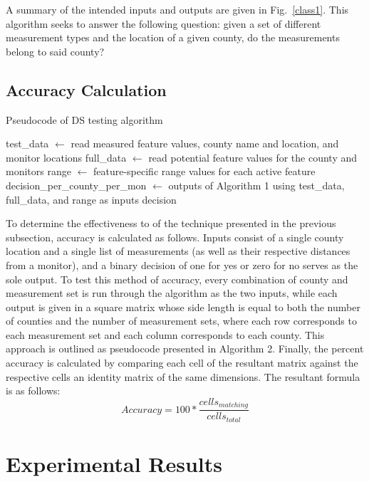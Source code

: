 \documentclass[12pt]{uthesis-v12}  %
\begin{document}
A summary of the intended inputs and outputs are given in Fig.~\ref{class1}. This algorithm seeks to answer the following question: given a set of different measurement types and the location of a given county, do the measurements belong to said county?

\subsection{Accuracy Calculation}

\begin{algorithm}
\caption{Pseudocode of DS testing algorithm} \label{alg-test}
\begin{algorithmic}[1]
\STATE test\_data $\leftarrow$ read measured feature values, county name and location, and monitor locations
\STATE full\_data $\leftarrow$ read potential feature values for the county and monitors
\STATE range $\leftarrow$ feature-specific range values for each active feature
		\STATE decision\_per\_county\_per\_mon $\leftarrow$ outputs of Algorithm 1 using test\_data, full\_data, and range as inputs
	\ENDFOR
\ENDFOR
\RETURN decision
	

\label{dst-test1}
\end{algorithmic}
\end{algorithm}

To determine the effectiveness to of the technique presented in the previous subsection, accuracy is calculated as follows. Inputs consist of a single county location and a single list of measurements (as well as their respective distances from a monitor), and a binary decision of one for yes or zero for no serves as the sole output. To test this method of accuracy, every combination of county and measurement set is run through the algorithm as the two inputs, while each output is given in a square matrix whose side length is equal to both the number of counties and the number of measurement sets, where each row corresponds to each measurement set and each column corresponds to each county. This approach is outlined as pseudocode presented in Algorithm 2. Finally, the percent accuracy is calculated by comparing each cell of the resultant matrix against the respective cells an identity matrix of the same dimensions. The resultant formula is as follows:
\begin{equation}
Accuracy = 100*\frac{cells_{matching}}{cells_{total}}
\label{acc}
\end{equation}

\section{Experimental Results}
\end{document}
